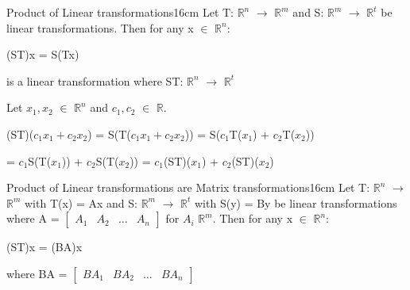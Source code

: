     \begin{definition}{Product of Linear transformations}{16cm}
        Let T: $\mathbb{R}^n$ $\rightarrow$ $\mathbb{R}^m$
        and S: $\mathbb{R}^m$ $\rightarrow$ $\mathbb{R}^t$
        be linear transformations. Then for any x $\in$ $\mathbb{R}^n$:

        \hspace{0.5cm}
        (ST)x = S(Tx)

        is a linear transformation where
        ST: $\mathbb{R}^n$ $\rightarrow$ $\mathbb{R}^t$

        \begin{boxedminipage}{16cm}
            Let $x_1,x_2$ $\in$ $\mathbb{R}^n$ and $c_1,c_2$ $\in$ $\mathbb{R}$.

            \hspace{0.5cm}
            (ST)($c_1x_1+c_2x_2$) = S(T($c_1x_1+c_2x_2$))
            = S($c_1$T($x_1$) + $c_2$T($x_2$))

            \hspace{3.8cm}
            = $c_1$S(T($x_1$)) + $c_2$S(T($x_2$))
            = $c_1$(ST)($x_1$) + $c_2$(ST)($x_2$)
        \end{boxedminipage}
    \end{definition}

    \vspace{0.5cm}



    \begin{wtheorem}{Product of Linear transformations are
    Matrix transformations}{16cm}
        Let T: $\mathbb{R}^n$ $\rightarrow$ $\mathbb{R}^m$ with T(x) = Ax
        and S: $\mathbb{R}^m$ $\rightarrow$ $\mathbb{R}^t$ with S(y) = By
        be linear transformations where
        A = $\begin{bmatrix}
                A_1 & A_2 & \hdots & A_n
            \end{bmatrix}$ for $A_i$ $\mathbb{R}^m$.
        Then for any x $\in$ $\mathbb{R}^n$:

        \hspace{0.5cm}
        (ST)x = (BA)x

        where BA =
        $\begin{bmatrix}
            BA_1 & BA_2 & \hdots & BA_n
        \end{bmatrix}$
    \end{wtheorem}

